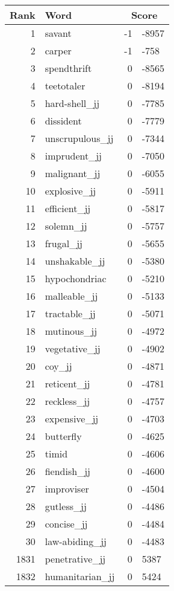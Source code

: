 \begin{longtable}[!htbp]{| rlr@{.}l |}
    \hline
    \textbf{Rank} & \textbf{Word} & \multicolumn{2}{c|}{\textbf{Score}} \\
    \hline
    \endhead
    1 & savant & -1 & -8957 \\
    2 & carper & -1 & -758 \\
    3 & spendthrift & 0 & -8565 \\
    4 & teetotaler & 0 & -8194 \\
    5 & hard-shell\_jj & 0 & -7785 \\
    6 & dissident & 0 & -7779 \\
    7 & unscrupulous\_jj & 0 & -7344 \\
    8 & imprudent\_jj & 0 & -7050 \\
    9 & malignant\_jj & 0 & -6055 \\
    10 & explosive\_jj & 0 & -5911 \\
    11 & efficient\_jj & 0 & -5817 \\
    12 & solemn\_jj & 0 & -5757 \\
    13 & frugal\_jj & 0 & -5655 \\
    14 & unshakable\_jj & 0 & -5380 \\
    15 & hypochondriac & 0 & -5210 \\
    16 & malleable\_jj & 0 & -5133 \\
    17 & tractable\_jj & 0 & -5071 \\
    18 & mutinous\_jj & 0 & -4972 \\
    19 & vegetative\_jj & 0 & -4902 \\
    20 & coy\_jj & 0 & -4871 \\
    21 & reticent\_jj & 0 & -4781 \\
    22 & reckless\_jj & 0 & -4757 \\
    23 & expensive\_jj & 0 & -4703 \\
    24 & butterfly & 0 & -4625 \\
    25 & timid & 0 & -4606 \\
    26 & fiendish\_jj & 0 & -4600 \\
    27 & improviser & 0 & -4504 \\
    28 & gutless\_jj & 0 & -4486 \\
    29 & concise\_jj & 0 & -4484 \\
    30 & law-abiding\_jj & 0 & -4483 \\
    1831 & penetrative\_jj & 0 & 5387 \\
    1832 & humanitarian\_jj & 0 & 5424 \\

\end{longtable}
